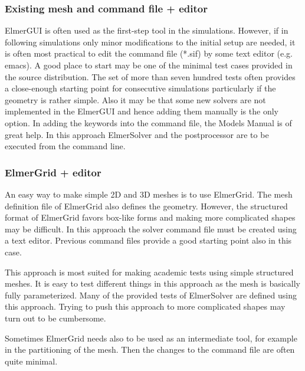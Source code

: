 \subsubsection*{Existing mesh and command file + editor}

ElmerGUI is often used as the first-step tool in the simulations. However, if in following simulations only minor
modifications to the initial setup are needed, it is often most practical to edit the command file 
(*.sif) by some text editor (e.g. emacs). A good place to start may be one of the minimal test cases 
provided in the source distribution. The set of more than seven hundred tests often provides a close-enough starting point
for consecutive simulations particularly if the geometry is rather simple.
Also it may be that some new solvers are not implemented in the 
ElmerGUI and hence adding them manually is the only option. 
In adding the keywords into the
command file, the Models Manual is of great help. In this approach ElmerSolver and the postprocessor 
are to be executed from the command line. 


\subsubsection*{ElmerGrid + editor}

An easy way to make simple 2D and 3D meshes is to use ElmerGrid. The mesh definition file 
of ElmerGrid also defines the geometry. However, the structured format of ElmerGrid favors
box-like forms and making more complicated shapes may be difficult. 
In this approach 
the solver command file must be created using a text editor. Previous command files provide a good 
starting point also in this case. 

This approach is most suited for making academic tests using simple structured meshes. 
It is easy to test different things in this approach as the mesh is basically fully parameterized. 
Many of the provided tests of ElmerSolver are defined using this approach. 
Trying to push this approach to more complicated shapes may turn out to be cumbersome. 
 
Sometimes ElmerGrid needs also to be used as an intermediate tool, for example in the partitioning of the mesh.
Then the changes to the command file are often quite minimal. 



